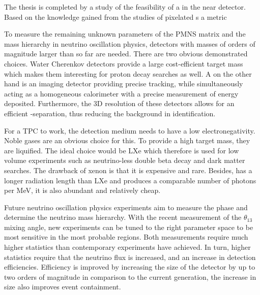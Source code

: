 The thesis is completed by a study of the feasibility of a \lartpc{} in the \dune{} near detector.
Based on the knowledge gained from the studies of pixelated \lartpc{}s a metric


To measure the remaining unknown parameters of the PMNS matrix and the mass hierarchy in neutrino oscillation physics, detectors with masses of orders of magnitude larger than so far are needed.
There are two obvious demonstrated choices.
Water Cherenkov detectors provide a large cost-efficient target mass which makes them interesting for proton decay searches as well.
A \lartpc{} on the other hand is an imaging detector providing precise tracking, while simultaneously acting as a homogeneous calorimeter with a precise measurement of energy deposited.
Furthermore, the 3D resolution of these detectors allows for an efficient \Pepm-\Pgg separation, thus reducing the \Pgpz background in \Pgne identification.

For a TPC to work, the detection medium needs to have a low electronegativity.
Noble gases are an obvious choice for this.
To provide a high target mass, they are liquified.
The ideal choice would be LXe which therefore is used for low volume experiments such as neutrino-less double beta decay and dark matter searches.
The drawback of xenon is that it is expensive and rare.
Besides, \lar{} has a longer radiation length than LXe and produces a comparable number of photons per \si{\mega\electronvolt}, it is also abundant and relatively cheap.

Future neutrino oscillation physics experiments aim to measure the \dcp phase and determine the neutrino mass hierarchy.
With the recent measurement of the $\theta_{13}$ mixing angle, new experiments can be tuned to the right parameter space to be most sensitive in the most probable regions.
Both measurements require much higher statistics than contemporary experiments have achieved.
In turn, higher statistics require that the neutrino flux is increased, and an increase in detection efficiencies.
Efficiency is improved by increasing the size of the detector by up to two orders of magnitude in comparison to the current generation, the increase in size also improves event containment.

